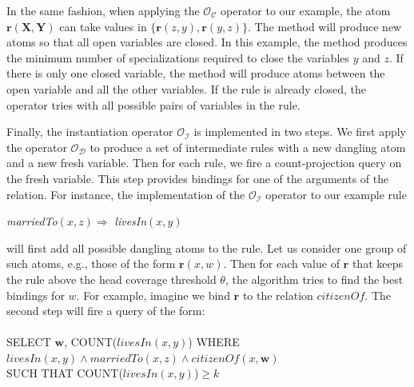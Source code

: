 {In the same fashion, when applying the $\mathcal{O_C}$ operator to our example, the atom $\bm{r}(\bm{X}, \bm{Y})$ 
can take values in $\{ \bm{r}(z,y), \bm{r}(y,z) \}$.
The method will produce new atoms so that all open variables are closed. In this example, the method produces the minimum number
of specializations required to close the variables $y$ and $z$. If there is only one closed variable, the method will produce atoms between
the open variable and all the other variables. If the rule is already closed, the operator tries with
all possible pairs of variables in the rule.

Finally, the instantiation operator $\mathcal{O_I}$ is implemented in two steps. 
We first apply the operator $\mathcal{O_D}$ to produce a set of intermediate rules 
with a new dangling atom and a new fresh variable.
Then for each rule, we fire a count-projection query on the fresh variable. 
This step provides bindings for one of the arguments of the relation.
For instance, the implementation of the $\mathcal{O_I}$ operator to our example 
rule 
\begin{center}
\emph{marriedTo}$(x,z) \Rightarrow $ \emph{livesIn}$(x,y)$
\end{center}

\noindent will first add all possible dangling atoms to the rule. Let us consider one group of such atoms, e.g., those of the form
$\bm{r}(x,w)$. Then for each
value of $\bm{r}$ that keeps the rule above the head coverage threshold $\theta$, the algorithm tries to find the best bindings for 
$w$. For example, imagine we bind $\bm{r}$ to the relation $citizenOf$. The second step will fire a query of the form:
\\\\
\noindent
SELECT $\bm{w}$, COUNT($livesIn(x,y)$) WHERE \\ 
$livesIn(x,y) \wedge marriedTo(x,z) \wedge citizenOf(x,\bm{w})$ \\
SUCH THAT COUNT($livesIn(x,y)$)$\ge k$\\

}
